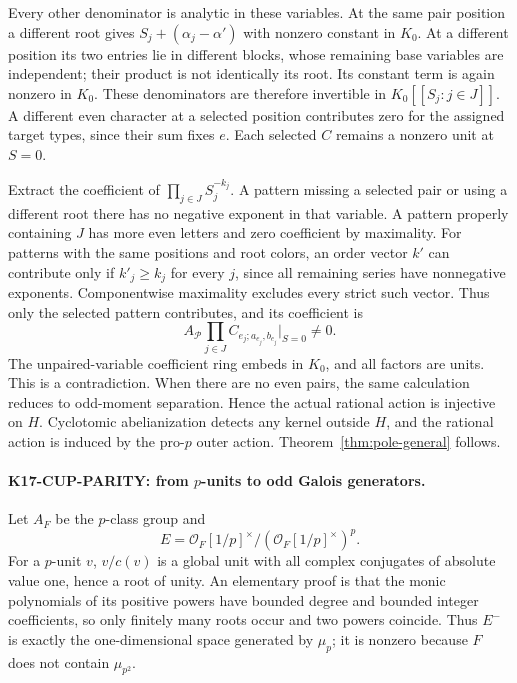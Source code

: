 \documentclass[11pt,a4paper]{article}
\theoremstyle{definition}
\begin{document}
Every other denominator is analytic in these variables. At the same pair position a different root gives $S_j+(\alpha_j-\alpha')$ with nonzero constant in $K_0$. At a different position its two entries lie in different blocks, whose remaining base variables are independent; their product is not identically its root. Its constant term is again nonzero in $K_0$. These denominators are therefore invertible in $K_0[[S_j:j\in J]]$. A different even character at a selected position contributes zero for the assigned target types, since their sum fixes $e$. Each selected $C$ remains a nonzero unit at $S=0$.

Extract the coefficient of $\prod_{j\in J}S_j^{-k_j}$. A pattern missing a selected pair or using a different root there has no negative exponent in that variable. A pattern properly containing $J$ has more even letters and zero coefficient by maximality. For patterns with the same positions and root colors, an order vector $k'$ can contribute only if $k'_j\ge k_j$ for every $j$, since all remaining series have nonnegative exponents. Componentwise maximality excludes every strict such vector. Thus only the selected pattern contributes, and its coefficient is
\[
 A_{\mathcal P}\prod_{j\in J}
 C_{e_j;a_{e_j},b_{e_j}}\big|_{S=0}\ne0.
\]
The unpaired-variable coefficient ring embeds in $K_0$, and all factors are units. This is a contradiction. When there are no even pairs, the same calculation reduces to odd-moment separation. Hence the actual rational action is injective on $H$. Cyclotomic abelianization detects any kernel outside $H$, and the rational action is induced by the pro-$p$ outer action. Theorem~\ref{thm:pole-general} follows.

\paragraph{K17-CUP-PARITY: from $p$-units to odd Galois generators.}
Let $A_F$ be the $p$-class group and
\[
 E=\mathcal O_F[1/p]^\times/(\mathcal O_F[1/p]^\times)^p.
\]
For a $p$-unit $v$, $v/c(v)$ is a global unit with all complex conjugates of absolute value one, hence a root of unity. An elementary proof is that the monic polynomials of its positive powers have bounded degree and bounded integer coefficients, so only finitely many roots occur and two powers coincide. Thus $E^-$ is exactly the one-dimensional space generated by $\mu_p$; it is nonzero because $F$ does not contain $\mu_{p^2}$.
\end{document}
